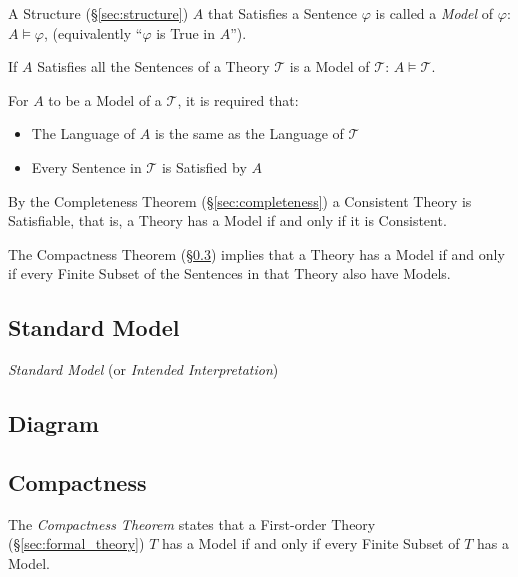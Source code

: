 A Structure (\S\ref{sec:structure}) $A$ that Satisfies a Sentence
$\varphi$ is called a \emph{Model} of $\varphi$: $A \vDash \varphi$,
(equivalently ``$\varphi$ is True in $A$'').

If $A$ Satisfies all the Sentences of a Theory $\mathcal{T}$ is a
Model of $\mathcal{T}$: $A \vDash \mathcal{T}$.

For $A$ to be a Model of a $\mathcal{T}$, it is required that:
\begin{itemize}
  \item The Language of $A$ is the same as the Language of
    $\mathcal{T}$
  \item Every Sentence in $\mathcal{T}$ is Satisfied by $A$
\end{itemize}
By the Completeness Theorem (\S\ref{sec:completeness}) a Consistent
Theory is Satisfiable, that is, a Theory has a Model if and only if it
is Consistent.

The Compactness Theorem (\S\ref{sec:compactness}) implies that a
Theory has a Model if and only if every Finite Subset of the Sentences
in that Theory also have Models.



\subsection{Standard Model}\label{sec:standard_model}

\emph{Standard Model} (or \emph{Intended Interpretation})



\subsection{Diagram}\label{sec:diagram}



\subsection{Compactness}\label{sec:compactness}

The \emph{Compactness Theorem} states that a First-order Theory
(\S\ref{sec:formal_theory}) $T$ has a Model if and only if every
Finite Subset of $T$ has a Model.

